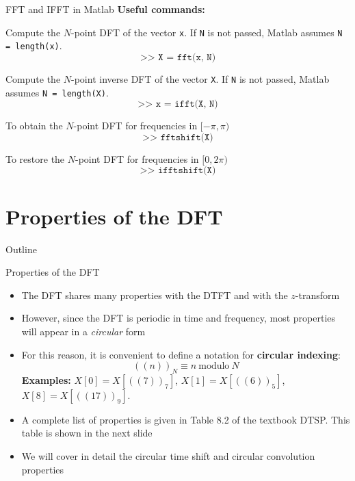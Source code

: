 \documentclass[10pt, handout]{beamer}
\begin{document}
\begin{frame}{FFT and IFFT in Matlab}
	\textbf{Useful commands:}
	
	Compute the $N$-point DFT of the vector \texttt{x}. If \texttt{N} is not passed, Matlab assumes \texttt{N = length(x)}.
	\begin{equation*}
		\texttt{>> X = fft(x, N)}
	\end{equation*}
		
	Compute the $N$-point inverse DFT of the vector \texttt{X}. If \texttt{N} is not passed, Matlab assumes \texttt{N = length(X)}.
	\begin{equation*}
	\texttt{>> x = ifft(X, N)}
	\end{equation*}
	
	To obtain the $N$-point DFT for frequencies in $[-\pi, \pi)$
	\begin{equation*}
	\texttt{>> fftshift(X)}
	\end{equation*}
	
	To restore the $N$-point DFT for frequencies in $[0, 2\pi)$
	\begin{equation*}
	\texttt{>> ifftshift(X)}
	\end{equation*}
	
\end{frame}

%
\section{Properties of the DFT}
\begin{frame}{Outline}
	\tableofcontents[currentsection]
\end{frame}
\begin{frame}{Properties of the DFT}
	\begin{itemize}
		\item The DFT shares many properties with the DTFT and with the $z$-transform
		\item However, since the DFT is periodic in time and frequency, most properties will appear in a \textit{circular} form
		\item For this reason, it is convenient to define a notation for \textbf{circular indexing}:
		\begin{equation*}
			((n))_N \equiv n~\text{modulo}~N
		\end{equation*}
		\textbf{Examples:} $X[0] = X[((7))_7]$, $X[1] = X[((6))_5]$, $X[8] = X[((17))_9]$.
		
		\item A complete list of properties is given in Table 8.2 of the textbook DTSP. This table is shown in the next slide
		\item We will cover in detail the circular time shift and circular convolution properties
	\end{itemize}
\end{frame}
\end{document}
